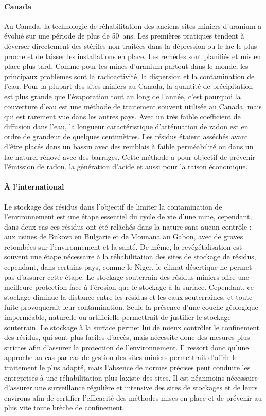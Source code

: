 \documentclass{article}
\begin{document}
\paragraph{Canada}
Au Canada, la technologie de réhabilitation des anciens sites miniers d'uranium a évolué sur une période de plus de 50~ans. Les premières pratiques tendent à déverser directement des stériles non traitées dans la dépression ou le lac le plus proche et de laisser les installations en place. Les remèdes sont planifiés et mis en place plus tard. Comme pour les mines d'uranium partout dans le monde, les principaux problèmes sont la radioactivité, la dispersion et la contamination de l'eau. Pour la plupart des sites miniers au Canada, la quantité de précipitation est plus grande que l'évaporation tout au long de l'année, c’est pourquoi la couverture d’eau est une méthode de traitement souvent utilisée au Canada, mais qui est rarement vue dans les autres pays. Avec un très faible coefficient de diffusion dans l’eau, la longueur caractéristique d’atténuation de radon est en ordre de grandeur de quelques centimètres. Les résidus étaient asséchés avant d'être placés dans un bassin avec des remblais à faible perméabilité ou dans un lac naturel rénové avec des barrages. Cette méthode a pour objectif de prévenir l’émission de radon, la génération d’acide et aussi pour la raison économique.


\paragraph{À l'international}
Le stockage des résidus dans l’objectif de limiter la contamination de l’environnement est une étape essentiel du cycle de vie d’une mine, cependant, dans deux cas ces résidus ont été relâchés dans la nature sans aucun contrôle : aux usines de Bukovo en Bulgarie et de Mounana au Gabon, avec de graves retombées sur l’environnement et la santé. De même, la revégétalisation est souvent une étape nécessaire à la réhabilitation des sites de stockage de résidus, cependant, dans certains pays, comme le Niger, le climat désertique ne permet pas d’assurer cette étape.
Le stockage souterrain des résidus miniers offre une meilleure protection face à l’érosion que le stockage à la surface. Cependant, ce stockage diminue la distance entre les résidus et les eaux souterraines, et toute fuite provoquerait leur contamination. Seule la présence d’une couche géologique imperméable, naturelle ou artificielle permettrait de justifier le stockage souterrain. Le stockage à la surface permet lui de mieux contrôler le confinement des résidus, qui sont plus faciles d’accès, mais nécessite donc des mesures plus strictes afin d’assurer la protection de l’environnement.
Il ressort donc qu’une approche au cas par cas de gestion des sites miniers permettrait d’offrir le traitement le plus adapté, mais l’absence de normes précises peut conduire les entreprises à une réhabilitation plus laxiste des sites.
Il est néanmoins nécessaire d’assurer une surveillance régulière et intensive des sites de stockages et de leurs environs afin de certifier l’efficacité des méthodes mises en place et de prévenir au plus vite toute brèche de confinement.
\end{document}
